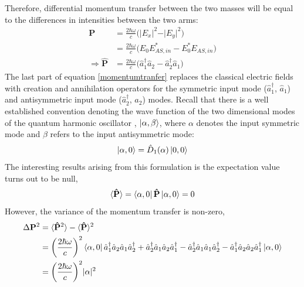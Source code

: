 		Therefore, differential momentum transfer between the two masses will be equal to the differences in intensities between the two arms:
		\begin{equation}\label{momentumtranfer}
		\begin{aligned}
		 \mathbf{P} 	&= \frac{2 \hbar \omega}{c} \bigg( \vert E_x \vert^2 - \vert E_y \vert^2 \bigg) \\
						&= \frac{2 \hbar \omega}{c} \bigg( E_0 E^*_{AS,in} - E_0^*E_{AS,in} \bigg)\\
		\Rightarrow	\mathbf{\hat{P}}&= \frac{2 \hbar \omega}{c} \bigg( \hat{a}_1^{\dagger} \hat{a}_2 - \hat{a}_2^{\dagger} \hat{a}_1 \bigg)
		\end{aligned}
		\end{equation}
		The last part of equation \ref{momentumtranfer} replaces the classical electric fields with creation and annihilation operators for the symmetric input mode ($\hat{a}_1^{\dagger}$, $\hat{a}_1$) and antisymmetric input mode ($\hat{a}_2^{\dagger}$, $\hat{a}_2$) modes. Recall that there is a well established convention denoting the wave function of the two dimensional modes of the quantum harmonic oscillator \cite{GerryKnight}, $\ket{\alpha,\beta}$, where $\alpha$ denotes the input symmetric mode and $\beta$ refers to the input antisymmetric mode:
		\begin{equation}
		\ket{\alpha,0} = \hat{D}_1(\alpha) \ket{0,0}
		\end{equation}
		The interesting results arising from this formulation is the expectation value turns out to be null,
		\begin{equation}
		\langle \mathbf{\hat{P}} \rangle = \bra{\alpha,0} \mathbf{\hat{P}}\ket{\alpha,0} = 0
		\end{equation}
		However, the variance of the momentum transfer is non-zero, 
		\begin{equation} 
		\begin{aligned}
		\Delta \mathbf{P}^2 &= \langle \mathbf{\hat{P}}^2 \rangle  - \langle \mathbf{\hat{P}} \rangle^2 \\
							&= \bigg(\frac{2 \hbar \omega}{c}\bigg)^2 \bra{\alpha,0}  \hat{a}_1^{\dagger}  \hat{a}_2  \hat{a}_1  \hat{a}_2^{\dagger} + \hat{a}_2^{\dagger}  \hat{a}_1  \hat{a}_2  \hat{a}_1^{\dagger}
							- \hat{a}_2^{\dagger}  \hat{a}_1  \hat{a}_1  \hat{a}_2^{\dagger} - \hat{a}_1^{\dagger}  \hat{a}_2  \hat{a}_2  \hat{a}_1^{\dagger} \ket{\alpha,0}\\
							&= \bigg(\frac{2 \hbar \omega}{c}\bigg)^2 \vert \alpha \vert^2
		\end{aligned}
		\end{equation}
